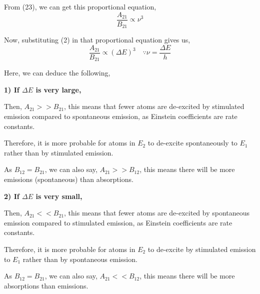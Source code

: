 \documentclass[12pt]{article}
\begin{document}
From (23), we can get this proportional equation,
\begin{equation*}
    \frac{A_{21}}{B_{21}} \propto \nu^{3}
\end{equation*}

Now, substituting (2) in that proportional equation gives us,
\begin{equation}
    \frac{A_{21}}{B_{21}} \propto (\Delta E)^{3} \quad \because \nu = \frac{\Delta E}{h}
\end{equation}

Here, we can deduce the following, 

\begin{block}
    \textbf{1) If $\Delta E$ is very large,}

    \begin{block}
        Then, $A_{21} >> B_{21}$, this means that fewer atoms are de-excited by stimulated emission compared to spontaneous emission, as Einstein coefficients are rate constants. \vspace{.2cm}

        Therefore, it is more probable for atoms in $E_{2}$ to de-excite spontaneously to $E_{1}$ rather than by stimulated emission. \vspace{.2cm}

        As $B_{12} = B_{21}$, we can also say, $A_{21} >> B_{12}$, this means there will be more emissions (spontaneous) than absorptions.
    \end{block} \vspace{.2cm}

    \textbf{2) If $\Delta E$ is very small,}

    \begin{block}
        Then, $A_{21} << B_{21}$, this means that fewer atoms are de-excited by spontaneous emission compared to stimulated emission, as Einstein coefficients are rate constants. \vspace{.2cm}

        Therefore, it is more probable for atoms in $E_{2}$ to de-excite by stimulated emission to $E_{1}$ rather than by spontaneous emission. \vspace{.2cm}

        As $B_{12} = B_{21}$, we can also say, $A_{21} << B_{12}$, this means there will be more absorptions than emissions.
    \end{block}
\end{block} \vspace{.3cm}
\end{document}
